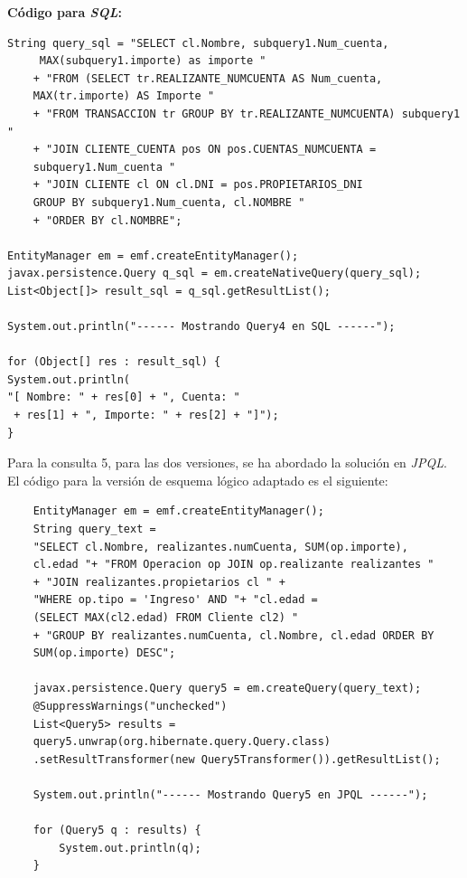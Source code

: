 \documentclass[11pt,a4paper]{article}
\begin{document}
\bigbreak
\textbf{Código para \textit{SQL}:}

\begin{lstlisting}
String query_sql = "SELECT cl.Nombre, subquery1.Num_cuenta,
	 MAX(subquery1.importe) as importe "
	+ "FROM (SELECT tr.REALIZANTE_NUMCUENTA AS Num_cuenta, 
	MAX(tr.importe) AS Importe "
	+ "FROM TRANSACCION tr GROUP BY tr.REALIZANTE_NUMCUENTA) subquery1 "
	+ "JOIN CLIENTE_CUENTA pos ON pos.CUENTAS_NUMCUENTA = 
	subquery1.Num_cuenta "
	+ "JOIN CLIENTE cl ON cl.DNI = pos.PROPIETARIOS_DNI 
	GROUP BY subquery1.Num_cuenta, cl.NOMBRE "
	+ "ORDER BY cl.NOMBRE";

EntityManager em = emf.createEntityManager();
javax.persistence.Query q_sql = em.createNativeQuery(query_sql);
List<Object[]> result_sql = q_sql.getResultList();

System.out.println("------ Mostrando Query4 en SQL ------");

for (Object[] res : result_sql) {
System.out.println(
"[ Nombre: " + res[0] + ", Cuenta: "
 + res[1] + ", Importe: " + res[2] + "]");
}

\end{lstlisting}


\bigbreak
Para la consulta 5, para las dos versiones, se ha abordado la solución en \emph{JPQL}. \\
El código para la versión de esquema lógico adaptado es el siguiente:

\begin{lstlisting}
	EntityManager em = emf.createEntityManager();
   	String query_text = 
    "SELECT cl.Nombre, realizantes.numCuenta, SUM(op.importe), 
    cl.edad "+ "FROM Operacion op JOIN op.realizante realizantes "
    + "JOIN realizantes.propietarios cl " + 
    "WHERE op.tipo = 'Ingreso' AND "+ "cl.edad = 
    (SELECT MAX(cl2.edad) FROM Cliente cl2) "
    + "GROUP BY realizantes.numCuenta, cl.Nombre, cl.edad ORDER BY 
    SUM(op.importe) DESC";

    javax.persistence.Query query5 = em.createQuery(query_text);
   	@SuppressWarnings("unchecked")
    List<Query5> results = 
    query5.unwrap(org.hibernate.query.Query.class)
    .setResultTransformer(new Query5Transformer()).getResultList();

   	System.out.println("------ Mostrando Query5 en JPQL ------");

  	for (Query5 q : results) {
   		System.out.println(q);
  	}
\end{lstlisting}
\end{document}
